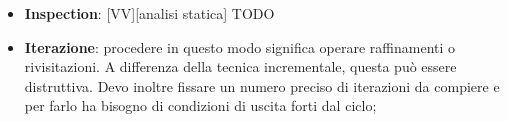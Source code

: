 \begin{itemize}
	\item \textbf{Inspection}: [VV][analisi statica] TODO

	\item \textbf{Iterazione}: procedere in questo modo significa operare raffinamenti o rivisitazioni. A differenza della tecnica incrementale, questa può essere distruttiva. \newline
Devo inoltre fissare un numero preciso di iterazioni da compiere e per farlo ha bisogno di condizioni di uscita forti dal ciclo;

\end{itemize}